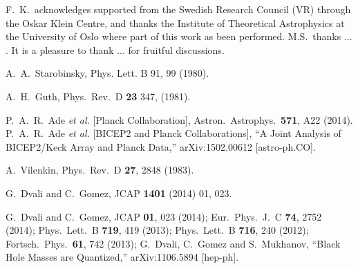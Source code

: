 \documentclass[aps, prd, preprint, superscriptaddress, tightenlines, nofootinbib]{revtex4}
\begin{document}
\noindent




\acknowledgements
\vspace{-4mm}F.~K.~acknowledges supported from the Swedish Research Council (VR)
through the Oskar Klein Centre, and thanks the Institute of Theoretical Astrophysics at the University of Oslo where part of this work as been performed. M.S.~thanks ... . It is a pleasure to thank ... for fruitful discussions.


\begin{thebibliography}{99}

	A.~A.~Starobinsky,
	Phys. Lett. B 91, 99 (1980).

	A.~H.~Guth,
	Phys.~Rev.~D {\bf 23} 347, (1981).

	P.~A.~R.~Ade {\it et al.} [Planck Collaboration],
	Astron.~Astrophys.~{\bf 571}, A22 (2014).
	P.~A.~R.~Ade {\it et al.}  [BICEP2 and Planck Collaborations],
	``A Joint Analysis of BICEP2/Keck Array and Planck Data,''
	arXiv:1502.00612 [astro-ph.CO].

	A.~Vilenkin,
	Phys.~Rev.~D {\bf 27}, 2848 (1983).

	G.~Dvali and C.~Gomez,
	JCAP {\bf 1401} (2014) 01, 023.

	G.~Dvali and C.~Gomez,
	JCAP {\bf 01}, 023 (2014);
	Eur.~Phys.~J.~C {\bf 74}, 2752 (2014);
	Phys.~Lett.~B {\bf 719}, 419 (2013);
	Phys.~Lett.~B {\bf 716}, 240 (2012);
	Fortsch.~Phys.~{\bf 61}, 742 (2013);
	G.~Dvali, C.~Gomez and S.~Mukhanov,
	``Black Hole Masses are Quantized,''
	arXiv:1106.5894 [hep-ph].


\end{thebibliography}
\end{document}

